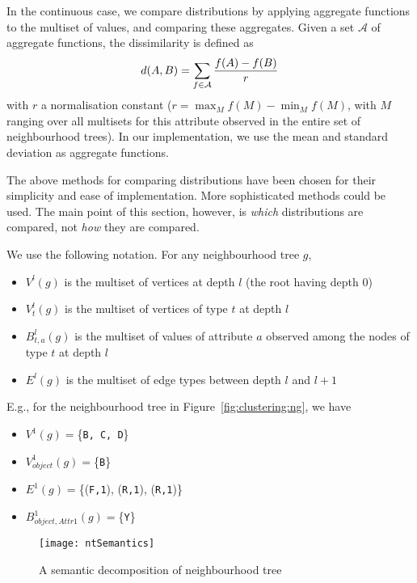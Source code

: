 In the continuous case, we compare distributions by applying aggregate functions to the multiset of values, and comparing these aggregates.
Given a set $\mathcal{A}$ of aggregate functions, the dissimilarity is defined as
\begin{equation}
    d(A,B) = \sum_{f \in \mathcal{A}} {f(A)-f(B) \over r }
\end{equation}
with $r$ a normalisation constant ($r = \max_M f(M) - \min_M f(M)$, with $M$ ranging over all multisets for this attribute observed in the entire set of neighbourhood trees).
In our implementation, we use the mean and standard deviation as aggregate functions.


The above methods for comparing distributions have been chosen for their simplicity and ease of implementation.  More sophisticated methods could be used.
The main point of this section, however, is {\em which} distributions are compared, not {\em how} they are compared.


We use the following notation.  For any neighbourhood tree $g$,
\begin{itemize}
\item[\textbullet] $V^l(g)$ is the multiset of vertices at depth $l$ (the root having depth 0)
\item[\textbullet] $V^l_t(g)$ is the multiset of vertices of type $t$ at depth $l$
\item[\textbullet] $B^l_{t,a}(g)$ is the multiset of values of attribute $a$ observed among the nodes of type $t$ at depth $l$
\item[\textbullet] $E^l(g)$ is the multiset of edge types between depth $l$ and $l+1$
\end{itemize}

E.g., for the neighbourhood tree in Figure~\ref{fig:clustering:ng}, we have
\begin{itemize}
    \item[\textbullet] $V^1(g) = $\{{\tt B, C, D}\}
    \item[\textbullet] $V^1_{object}(g) = $\{{\tt B}\}
    \item[\textbullet] $E^1(g) = $\{({\tt F,1}), ({\tt R,1}), ({\tt R,1})\}
    \item[\textbullet] $B^1_{object,Attr1}(g) = $\{{\tt Y}\}
\end{itemize}




\begin{figure}
	\centering
	\texttt{[image: ntSemantics]}
	\caption{A semantic decomposition of neighbourhood tree\label{fig:ntsemantics}}
\end{figure}

